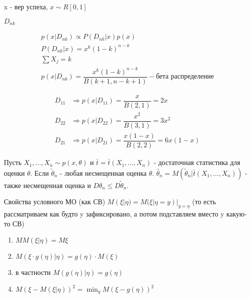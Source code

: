 \begin{ex}
  x - вер успеха, $x \sim R[0, 1]$

  $D_{nk}$

  \begin{multline*}
    p(x|D_{nk}) \propto P(D_{nk} | x) p(x) \\
    P(D_{nk} | x) = x^k (1-k)^{n-k} \\
    \sum X_j = k \\
    p(x|D_{nk}) = \dfrac{x^k (1-k)^{n-k}}{B(k+1, n-k+1)} - \text{бета распределение}
  \end{multline*}

  \begin{align*}
    D_{11} &\Rightarrow p(x|D_{11}) = \dfrac{x}{B(2, 1)} = 2x \\
    D_{22} &\Rightarrow p(x|D_{22}) = \dfrac{x^2}{B(3, 1)} = 3x^2 \\
    D_{21} &\Rightarrow p(x|D_{21}) = \dfrac{x (1-x)}{B(2, 2)} = 6x(1-x)
  \end{align*}
\end{ex}

\begin{theorem}
  Пусть $X_1, \dots, X_n \sim p(x, \theta)$ и $\bar t = \bar t(X_1, \dots, X_n)$ - достаточная статистика для оценки $\theta$.
  Если $\tilde \theta_n$ - любая несмещенная оценка $\theta$. $\hat \theta_n = M(\tilde \theta_n | \bar t(X_1, \dots, X_n))$ - также несмещенная оценка и $D\hat \theta _n \leqslant D \tilde \theta_n$.
\end{theorem}

Свойства условного МО (как СВ)
$M(\xi|\eta) = M(\xi | \eta = y) |_{y=\eta}$ (то есть рассматриваем как будто y зафиксировано, а потом подставляем вместо y какую-то СВ)
\begin{enumerate}
  \item $MM(\xi | \eta) = M\xi$ 
  \item $M(\xi \cdot g(\eta) | \eta) = g(\eta) \cdot M(\xi)$
  \item в частности $M\left(g(\eta) | \eta\right) = g(\eta)$
  \item $M(\xi - M(\xi | \eta))^2 = \min_g M(\xi - g(\eta))^2$
\end{enumerate}

